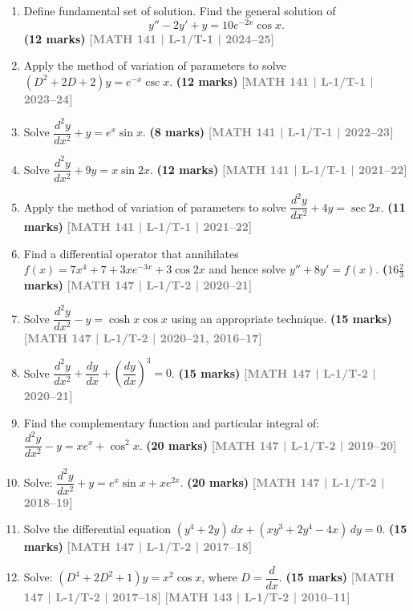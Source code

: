 \documentclass[12pt,a3paper]{article}
\newcommand{\yr}[1]{\hfill\textcolor{gray}{\small\textbf{[#1]}}}
\newcommand{\mk}[1]{\textcolor{orange!70!black}{\small\textbf{(#1 marks)}}}
\begin{document}
\begin{enumerate}
\item Define fundamental set of solution. Find the general solution of
    \[
      y''-2y'+y=10e^{-2x}\cos x.
    \] 
\mk{12} \yr{MATH 141 | L-1/T-1 | 2024--25}
  
\item Apply the method of variation of parameters to solve $(D^{2}+2D+2)y=e^{-x}\csc x$.
\mk{12} \yr{MATH 141 | L-1/T-1 | 2023--24}

\item Solve $\dfrac{d^{2}y}{dx^{2}}+y=e^{x}\sin x$.
\mk{8} \yr{MATH 141 | L-1/T-1 | 2022--23}

\item Solve $\dfrac{d^{2}y}{dx^{2}}+9y=x\sin 2x$.
\mk{12} \yr{MATH 141 | L-1/T-1 | 2021--22}

\item Apply the method of variation of parameters to solve $\dfrac{d^{2}y}{dx^{2}}+4y=\sec 2x$.
\mk{11} \yr{MATH 141 | L-1/T-1 | 2021--22}

\item Find a differential operator that annihilates $f(x)=7x^{4}+7+3xe^{-3x}+3\cos 2x$ and hence solve $y''+8y'=f(x)$.
\mk{$16\tfrac{2}{3}$} \yr{MATH 147 | L-1/T-2 | 2020--21}

\item Solve $\dfrac{d^{2}y}{dx^{2}}-y=\cosh x\cos x$ using an appropriate technique.
\mk{15} \yr{MATH 147 | L-1/T-2 | 2020--21, 2016--17}

\item Solve $\dfrac{d^{2}y}{dx^{2}}+\dfrac{dy}{dx}+\left(\dfrac{dy}{dx}\right)^{3}=0$.
\mk{15} \yr{MATH 147 | L-1/T-2 | 2020--21}

\item Find the complementary function and particular integral of: $\dfrac{d^{2}y}{dx^{2}}-y=xe^{x}+\cos^{2}x$.
\mk{20} \yr{MATH 147 | L-1/T-2 | 2019--20}

\item Solve: $\dfrac{d^{2}y}{dx^{2}}+y=e^{x}\sin x+xe^{2x}$.
\mk{20} \yr{MATH 147 | L-1/T-2 | 2018--19}

\item Solve the differential equation $(y^{4}+2y)\,dx+(xy^{3}+2y^{4}-4x)\,dy=0$.
\mk{15} \yr{MATH 147 | L-1/T-2 | 2017--18}

\item Solve: $(D^{4}+2D^{2}+1)y=x^{2}\cos x$, where $D=\dfrac{d}{dx}$.
\mk{15} \yr{MATH 147 | L-1/T-2 | 2017--18} \yr{MATH 143 | L-1/T-2 | 2010--11}


\end{enumerate}
\end{document}
